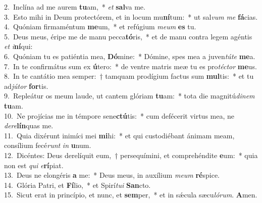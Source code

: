 {2.~}Inclína ad me aurem \textbf{tu}am,~* \textit{et} \textbf{sal}va me.\\
{3.~}Esto mihi in Deum protectórem, et in locum mu\textbf{ní}tum:~* ut sal\textit{vum} \textit{me} \textbf{fá}cias.\\
{4.~}Quóniam firmaméntum \textbf{me}um,~* et refúgium \textit{me}\textit{um} \textbf{es} tu.\\
{5.~}Deus meus, éripe me de manu pecca\textbf{tó}ris,~* et de manu contra legem agéntis \textit{et} \textit{i}\textbf{ní}qui:\\
{6.~}Quóniam tu es patiéntia mea, \textbf{Dó}mine:~* Dómine, spes mea a juven\textit{tú}\textit{te} \textbf{me}a.\\
{7.~}In te confirmátus sum ex \textbf{ú}tero:~* de ventre matris meæ tu es pro\textit{té}\textit{ctor} \textbf{me}us.\\
{8.~}In te cantátio mea semper:~† tamquam prodígium factus sum \textbf{mul}tis:~* et tu ad\textit{jú}\textit{tor} \textbf{for}tis.\\
{9.~}Repleátur os meum laude, ut cantem glóriam \textbf{tu}am:~* tota die magnitú\textit{di}\textit{nem} \textbf{tu}am.\\
{10.~}Ne projícias me in témpore sene\textbf{ctú}tis:~* cum defécerit virtus mea, ne \textit{de}\textit{re}\textbf{lín}quas me.\\
{11.~}Quia dixérunt inimíci mei \textbf{mi}hi:~* et qui custodiébant ánimam meam, consílium fecé\textit{runt} \textit{in} \textbf{u}num.\\
{12.~}Dicéntes: Deus derelíquit eum,~† persequímini, et comprehéndite \textbf{e}um:~* quia non est \textit{qui} \textit{e}\textbf{rí}piat.\\
{13.~}Deus ne elongéris \textbf{a} me:~* Deus meus, in auxílium \textit{me}\textit{um} \textbf{ré}spice.\\
{14.~}Glória Patri, et \textbf{Fí}lio,~* et Spirí\textit{tu}\textit{i} \textbf{San}cto.\\
{15.~}Sicut erat in princípio, et nunc, et \textbf{sem}per,~* et in sǽcula sæcu\textit{ló}\textit{rum}. \textbf{A}men.\\
